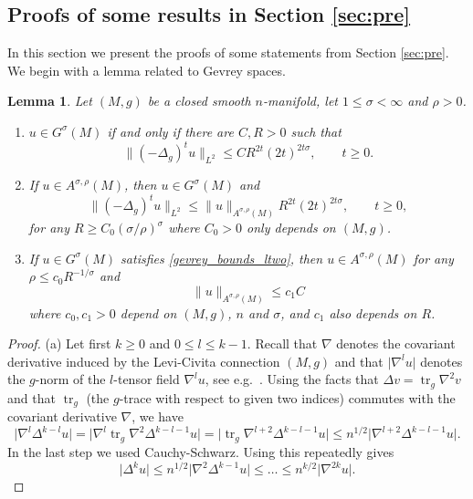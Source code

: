 \documentclass[12pt,twoside]{amsart}
\numberwithin{equation}{section}
\renewcommand{\leq}{\leqslant}
\renewcommand{\geq}{\geqslant}
\newtheorem{lemma}[theorem]{Lemma}
\DeclareMathOperator{\tr}{tr}
\newcommand{\abs}[1]{\lvert #1 \rvert}          %
\newcommand{\norm}[1]{\lVert #1 \rVert}         %
\begin{document}
\begin{appendix}
\section{Proofs of some results in Section \ref{sec:pre}} \label{sec_appendix_nonlinear}

In this section we present the proofs of some statements from Section \ref{sec:pre}. We begin with a lemma related to Gevrey spaces.

\begin{lemma} \label{lemma_arho_comega}
Let $(M,g)$ be a closed smooth $n$-manifold, let $1 \leq \sigma < \infty$ and $\rho > 0$.
\begin{enumerate}
\item[(a)] 
$u \in G^{\sigma}(M)$ if and only if there are $C, R > 0$ such that 
\begin{equation} \label{gevrey_bounds_ltwo}
\norm{(-\Delta_g)^t u}_{L^2} \leq C R^{2t} (2t)^{2t\sigma}, \qquad t \geq 0.
\end{equation}
\item[(b)] 
If $u \in A^{\sigma,\rho}(M)$, then $u \in G^{\sigma}(M)$ and 
\[
\norm{(-\Delta_g)^t u}_{L^2} \leq \norm{u}_{A^{\sigma,\rho}(M)} R^{2t} (2t)^{2t\sigma}, \qquad t \geq 0,
\]
for any $R \geq C_0 (\sigma/\rho)^{\sigma}$ where $C_0 > 0$ only depends on $(M,g)$.
\item[(c)] 
If $u \in G^{\sigma}(M)$ satisfies \eqref{gevrey_bounds_ltwo}, then $u \in A^{\sigma,\rho}(M)$ for any $\rho \leq c_0 R^{-1/\sigma}$ and 
\[
\norm{u}_{A^{\sigma,\rho}(M)} \leq c_1 C
\]
where $c_0, c_1 > 0$ depend on $(M,g)$, $n$ and $\sigma$, and $c_1$ also depends on $R$.
\end{enumerate}
\end{lemma}
\begin{proof}
(a) Let first $k \geq 0$ and $0 \leq l \leq k-1$. Recall that $\nabla$ denotes the covariant derivative induced by the Levi-Civita connection $(M,g)$ and that $\abs{\nabla^l u}$ denotes the $g$-norm of the $l$-tensor field $\nabla^l u$, see e.g.\ \cite{Besse}. Using the facts that $\Delta v = \tr_g \nabla^2 v$ and that $\tr_g$ (the $g$-trace with respect to given two indices) commutes with the covariant derivative $\nabla$, we have 
\[
\abs{\nabla^l \Delta^{k-l} u} = \abs{\nabla^l \tr_g \nabla^2 \Delta^{k-l-1} u} = \abs{\tr_g \nabla^{l+2} \Delta^{k-l-1} u} \leq n^{1/2} \abs{\nabla^{l+2} \Delta^{k-l-1} u}.
\]
In the last step we used Cauchy-Schwarz. Using this repeatedly gives 
\[
\abs{\Delta^k u} \leq n^{1/2} \abs{\nabla^2 \Delta^{k-1} u} \leq \ldots \leq n^{k/2} \abs{\nabla^{2k} u}.
\]
\end{proof}
\end{appendix}
\end{document}
